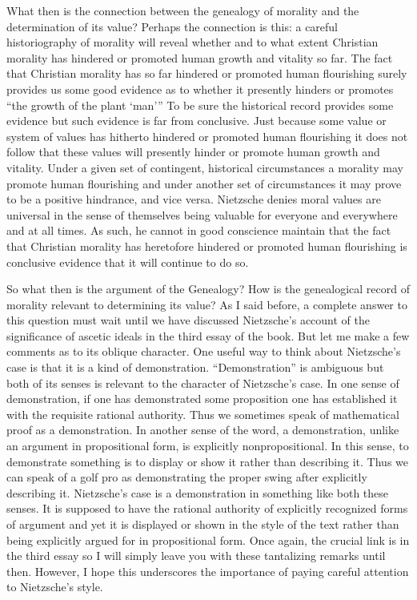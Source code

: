 What then is the connection between the genealogy of morality and the determination of its value? Perhaps the connection is this: a careful historiography of morality will reveal whether and to what extent Christian morality has hindered or promoted human growth and vitality so far. The fact that Christian morality has so far hindered or promoted human flourishing surely provides us some good evidence as to whether it presently hinders or promotes ``the growth of the plant `man''' To be sure the historical record provides some evidence but such evidence is far from conclusive. Just because some value or system of values has hitherto hindered or promoted human flourishing it does not follow that these values will presently hinder or promote human growth and vitality. Under a given set of contingent, historical circumstances a morality may promote human flourishing and under another set of circumstances it may prove to be a positive hindrance, and vice versa. Nietzsche denies moral values are universal in the sense of themselves being valuable for everyone and everywhere and at all times. As such, he cannot in good conscience maintain that the fact that Christian morality has heretofore hindered or promoted human flourishing is conclusive evidence that it will continue to do so.

So what then is the argument of the Genealogy? How is the genealogical record of morality relevant to determining its value? As I said before, a complete answer to this question must wait until we have discussed Nietzsche's account of the significance of ascetic ideals in the third essay of the book. But let me make a few comments as to its oblique character. One useful way to think about Nietzsche's case is that it is a kind of demonstration. ``Demonstration'' is ambiguous but both of its senses is relevant to the character of Nietzsche's case. In one sense of demonstration, if one has demonstrated some proposition one has established it with the requisite rational authority. Thus we sometimes speak of mathematical proof as a demonstration. In another sense of the word, a demonstration, unlike an argument in propositional form, is explicitly nonpropositional. In this sense, to demonstrate something is to display or show it rather than describing it. Thus we can speak of a golf pro as demonstrating the proper swing after explicitly describing it. Nietzsche's case is a demonstration in something like both these senses. It is supposed to have the rational authority of explicitly recognized forms of argument and yet it is displayed or shown in the style of the text rather than being explicitly argued for in propositional form. Once again, the crucial link is in the third essay so I will simply leave you with these tantalizing remarks until then. However, I hope this underscores the importance of paying careful attention to Nietzsche's style. \change

